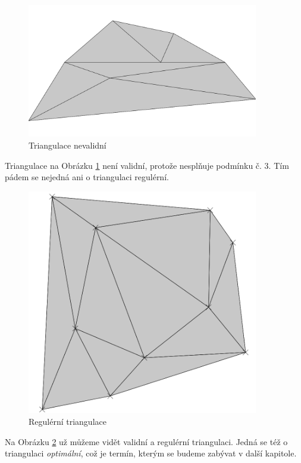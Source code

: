 \documentclass[12pt,a4paper]{article}
\begin{document}
\begin{figure}[h!]
\centering
\includegraphics[width=0.9\textwidth]{../img/nv.png}
\caption{Triangulace nevalidní}
\label{fig:train_not_valid}
\end{figure}

Triangulace na Obrázku \ref{fig:train_not_valid} není validní, protože nesplňuje podmínku č. 3. Tím pádem se nejedná ani o triangulaci regulérní.

\newpage
\begin{figure}[h!]
\centering
\includegraphics[width=0.9\textwidth]{../img/triangulation.png}
\caption{Regulérní triangulace}
\label{fig:triangulace}
\end{figure}

Na Obrázku \ref{fig:triangulace} už můžeme vidět validní a regulérní triangulaci. Jedná se též o triangulaci \textit{optimální}, což je termín, kterým se budeme zabývat v další kapitole.
\end{document}
